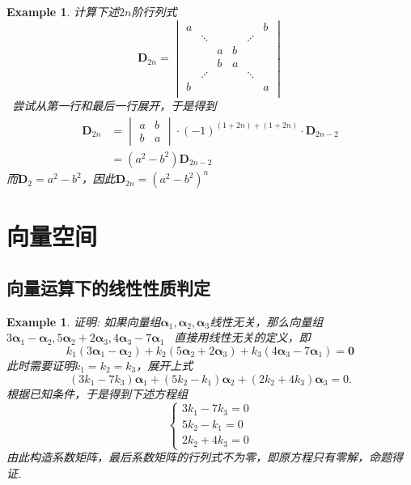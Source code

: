 \documentclass{article}
\newtheorem{example}[theorem]{Example}
\newcommand{\hints}{{\color{blue} \text{hints}}}
\newcommand{\mbf}[1]{\bm{#1}}
\begin{document}
\begin{example}
\rm 计算下述$2n$阶行列式
$$
\mbf{D}_{2n} = \begin{vmatrix}
a  & & & &  & b \\
   & \ddots & & & \iddots \\
  & & a & b &  &  \\
  & & b & a &  & \\
  &  \iddots & & &  \ddots \\
  b& & & &  &a\\
\end{vmatrix}
$$
\hints\ 尝试从第一行和最后一行展开，于是得到
$$
\begin{array}{ll}
\mbf{D}_{2n} &= \begin{vmatrix}
a & b \\
b & a 
\end{vmatrix}\cdot (-1)^{(1+2n)+(1+2n)}\cdot \mbf{D}_{2n-2} \\
&=(a^2-b^2)\mbf{D}_{2n-2}
\end{array} 
$$
而$\mbf{D}_2=a^2 - b^2$，因此$\mbf{D}_{2n} = (a^2-b^2)^{n}$ 
\end{example}



\newpage
\section{向量空间}

\subsection{向量运算下的线性性质判定}

\begin{example}
\rm 证明: 如果向量组$\mbf{\alpha}_1,\mbf{\alpha}_2,\mbf{\alpha}_3$线性无关，那么向量组$3\mbf{\alpha}_1-\mbf{\alpha}_2,5\mbf{\alpha}_2 + 2\mbf{\alpha}_3, 4\mbf{\alpha}_3-7\mbf{\alpha}_1$
\hints\ 直接用线性无关的定义，即
$$
k_1(3\mbf{\alpha}_1-\mbf{\alpha}_2) + k_2(5\mbf{\alpha}_2 + 2\mbf{\alpha}_3)+ k_3(4\mbf{\alpha}_3-7\mbf{\alpha}_1) = \mbf{0}
$$
此时需要证明$k_1 = k_2 = k_3$，展开上式
$$
(3k_1-7k_3)\mbf{\alpha}_1 + (5k_2 - k_1)\mbf{\alpha}_2 + (2k_2 +4k_3)\mbf{\alpha}_3 = 0. 
$$
根据已知条件，于是得到下述方程组
$$
\left \{
\begin{array}{ll}
3k_1-7k_3  = 0 \\
5k_2 - k_1 = 0 \\
2k_2 +4k_3 = 0
\end{array} \right.
$$
由此构造系数矩阵，最后系数矩阵的行列式不为零，即原方程只有零解，命题得证. 
\end{example}
\end{document}
